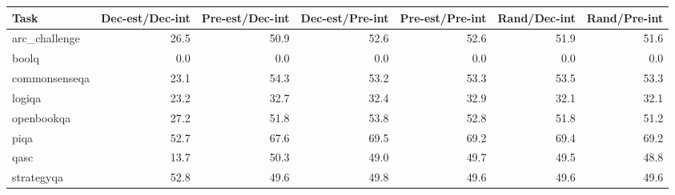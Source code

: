\begin{tabular}{lrrrrrr}
\toprule
Task & Dec-est/Dec-int & Pre-est/Dec-int & Dec-est/Pre-int & Pre-est/Pre-int & Rand/Dec-int & Rand/Pre-int \\
\midrule
arc_challenge & 26.5 & 50.9 & 52.6 & 52.6 & 51.9 & 51.6 \\
boolq & 0.0 & 0.0 & 0.0 & 0.0 & 0.0 & 0.0 \\
commonsenseqa & 23.1 & 54.3 & 53.2 & 53.3 & 53.5 & 53.3 \\
logiqa & 23.2 & 32.7 & 32.4 & 32.9 & 32.1 & 32.1 \\
openbookqa & 27.2 & 51.8 & 53.8 & 52.8 & 51.8 & 51.2 \\
piqa & 52.7 & 67.6 & 69.5 & 69.2 & 69.4 & 69.2 \\
qasc & 13.7 & 50.3 & 49.0 & 49.7 & 49.5 & 48.8 \\
strategyqa & 52.8 & 49.6 & 49.8 & 49.6 & 49.6 & 49.6 \\
\bottomrule
\end{tabular}
